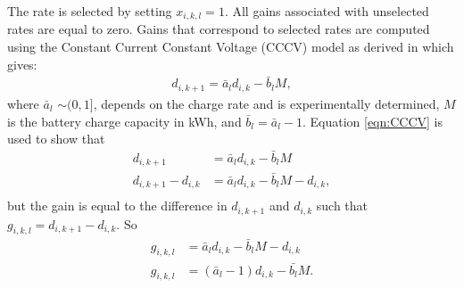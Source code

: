 

\par The rate is selected by setting $x_{i,k,l} = 1$. All gains associated with unselected rates are equal to zero. Gains that correspond to selected rates are computed using the Constant Current Constant Voltage (CCCV) model as derived in \cite{whitaker_network_2021} which gives:
\begin{align}\label{eqn:CCCV}
	d_{i,k+1} = \bar{a}_ld_{i,k} - \bar{b}_lM, 
\end{align}
where $\bar{a}_l$ $\sim(0,1]$, depends on the charge rate and is experimentally determined, $M$ is the battery charge capacity in kWh, and $\bar{b}_l = \bar{a}_l - 1$.
Equation \ref{eqn:CCCV} is used to show that
\begin{equation}\label{eqn:g}
\begin{aligned}
	d_{i,k+1} &= \bar{a}_ld_{i,k} - \bar{b}_lM \\ 
	d_{i,k+1} - d_{i,k} &= \bar{a}_ld_{i,k} - \bar{b}_lM - d_{i,k},\\
\end{aligned}
\end{equation}
but the gain is equal to the difference in $d_{i,k+1}$ and $d_{i,k}$ such that $g_{i,k,l} = d_{i,k+1} - d_{i,k}$.  So
\begin{equation}\label{eqn:CCCVFinal}
\begin{aligned}
	g_{i,k,l}  &= \bar{a}_ld_{i,k} - \bar{b}_lM - d_{i,k}\\
	g_{i,k,l}  &= (\bar{a}_l - 1)d_{i,k} - \bar{b_l}M.\\
\end{aligned}
\end{equation}

